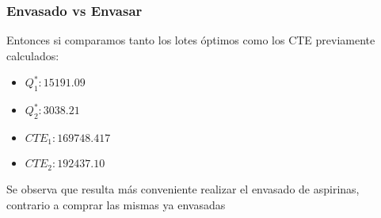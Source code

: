 \begin{homeworkProblem}
\subsubsection{Envasado vs Envasar}
Entonces si comparamos tanto los lotes óptimos como los CTE previamente calculados:
\begin{itemize}
    \item $Q^*_1:15191.09$
    \item $Q^*_2:3038.21$
    \item $CTE_1:169748.417$
    \item $CTE_2:192437.10$
\end{itemize}
Se observa que resulta más conveniente realizar el envasado de aspirinas, contrario a comprar las mismas ya envasadas
\end{homeworkProblem}